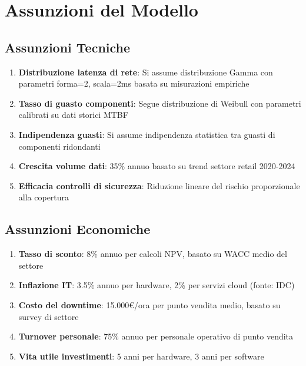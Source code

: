 \section{\texorpdfstring{Assunzioni del Modello}{D.2 - Assunzioni del Modello}}

\subsection{\texorpdfstring{Assunzioni Tecniche}{D.2.1 - Assunzioni Tecniche}}

\begin{enumerate}
    \item \textbf{Distribuzione latenza di rete}: Si assume distribuzione Gamma con parametri forma=2, scala=2ms basata su misurazioni empiriche
    \item \textbf{Tasso di guasto componenti}: Segue distribuzione di Weibull con parametri calibrati su dati storici MTBF
    \item \textbf{Indipendenza guasti}: Si assume indipendenza statistica tra guasti di componenti ridondanti
    \item \textbf{Crescita volume dati}: 35\% annuo basato su trend settore retail 2020-2024
    \item \textbf{Efficacia controlli di sicurezza}: Riduzione lineare del rischio proporzionale alla copertura
\end{enumerate}

\subsection{\texorpdfstring{Assunzioni Economiche}{D.2.2 - Assunzioni Economiche}}

\begin{enumerate}
    \item \textbf{Tasso di sconto}: 8\% annuo per calcoli NPV, basato su WACC medio del settore
    \item \textbf{Inflazione IT}: 3.5\% annuo per hardware, 2\% per servizi cloud (fonte: IDC)
    \item \textbf{Costo del downtime}: 15.000€/ora per punto vendita medio, basato su survey di settore
    \item \textbf{Turnover personale}: 75\% annuo per personale operativo di punto vendita
    \item \textbf{Vita utile investimenti}: 5 anni per hardware, 3 anni per software
\end{enumerate}

